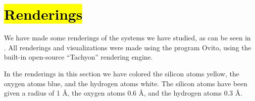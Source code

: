 \section[Renderings]{\hl{Renderings}}
We have made some renderings of the systems we have studied, as can be seen in . All renderings and visualizations were made using the program Ovito\cite{stukowski2010ovito}, using the built-in open-source ``Tachyon'' rendering engine.

In the renderings in this section we have colored the silicon atoms yellow, the oxygen atoms blue, and the hydrogen atoms white. The silicon atoms have been given a radius of 1 \AA, the oxygen atoms 0.6 \AA, and the hydrogen atoms 0.3 \AA.
%

